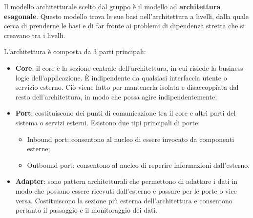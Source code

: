 \par Il modello architetturale scelto dal gruppo è il modello ad \textbf{architettura esagonale}. Questo modello trova le sue basi nell'architettura a livelli, dalla quale cerca di prenderne le basi e di far fronte ai problemi di dipendenza stretta che si creavano tra i livelli.
\par L'architettura è composta da 3 parti principali:
\begin{itemize}
    \item \textbf{Core}: il core è la sezione centrale dell'architettura, in cui risiede la business logic dell'applicazione. È indipendente da qualsiasi interfaccia utente o servizio esterno. Ciò viene fatto per mantenerla isolata e disaccoppiata dal resto dell'architettura, in modo che possa agire indipendentemente;
    \item \textbf{Port}: costituiscono dei punti di comunicazione tra il core e altri parti del sistema o servizi esterni. Esistono due tipi principali di porte:
    \begin{itemize}
        \item Inbound port: consentono al nucleo di essere invocato da componenti esterne;
        \item Outbound port: consentono al nucleo di reperire informazioni dall'esterno.
    \end{itemize}
    \item \textbf{Adapter}: sono pattern architetturali che permettono di adattare i dati in modo che possano essere ricevuti dall'esterno e passare per le porte o vice versa. Costituiscono la sezione più esterna dell'architettura e consentono pertanto il passaggio e il monitoraggio dei dati.
\end{itemize}

